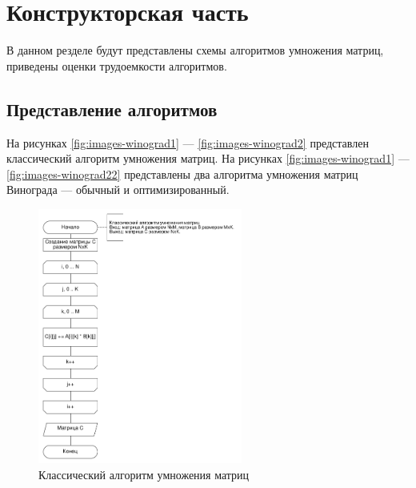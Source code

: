 \chapter{Конструкторская часть}

В данном резделе будут представлены схемы алгоритмов умножения матриц,
приведены оценки трудоемкости алгоритмов.

\section{Представление алгоритмов}

На рисунках \ref{fig:images-winograd1} --- \ref{fig:images-winograd2} представлен классический
алгоритм умножения матриц. На рисунках \ref{fig:images-winograd1} ---
\ref{fig:images-winograd22} представлены два алгоритма умножения матриц Винограда ---
обычный и оптимизированный.

\begin{figure}[h]
    \centering
    \includegraphics[width=0.6\textwidth]{images/classic}
    \caption{Классический алгоритм умножения матриц}
    \label{fig:images-classic}
\end{figure}

\clearpage

